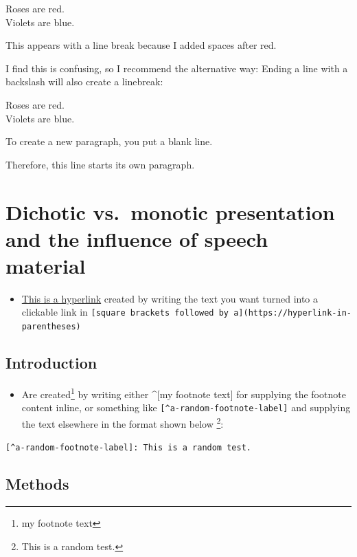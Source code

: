 \documentclass[a4paper, twoside]{templates/ociamthesis}
\providecommand{\tightlist}{%
  \setlength{\itemsep}{0pt}\setlength{\parskip}{0pt}}
\begin{document}
Roses are red.\\
Violets are blue.

This appears with a line break because I added spaces after red.

I find this is confusing, so I recommend the alternative way: Ending a line with a backslash will also create a linebreak:

Roses are red.\\
Violets are blue.

To create a new paragraph, you put a blank line.

Therefore, this line starts its own paragraph.

\hypertarget{dichotic-vs.-monotic-presentation-and-the-influence-of-speech-material}{%
\section{Dichotic vs.~monotic presentation and the influence of speech material}\label{dichotic-vs.-monotic-presentation-and-the-influence-of-speech-material}}

\begin{itemize}
\tightlist
\item
  \href{https://www.google.com}{This is a hyperlink} created by writing the text you want turned into a clickable link in \texttt{{[}square\ brackets\ followed\ by\ a{]}(https://hyperlink-in-parentheses)}
\end{itemize}

\hypertarget{introduction-2}{%
\subsection{Introduction}\label{introduction-2}}

\begin{itemize}
\tightlist
\item
  Are created\footnote{my footnote text} by writing either \^{}{[}my footnote text{]} for supplying the footnote content inline, or something like \texttt{{[}\^{}a-random-footnote-label{]}} and supplying the text elsewhere in the format shown below \footnote{This is a random test.}:
\end{itemize}

\texttt{{[}\^{}a-random-footnote-label{]}:\ This\ is\ a\ random\ test.}

\hypertarget{methods-2}{%
\subsection{Methods}\label{methods-2}}
\end{document}
